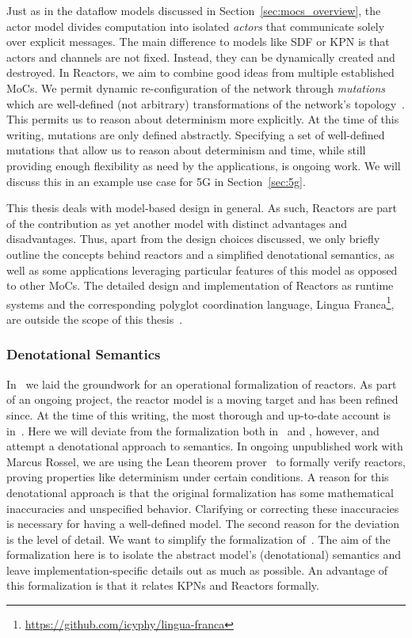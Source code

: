 Just as in the dataflow models discussed in Section~\ref{sec:mocs_overview}, the actor model divides computation into isolated \emph{actors} that communicate solely over explicit messages.
The main difference to models like \ac{SDF} or \ac{KPN} is that actors and channels are not fixed.
Instead, they can be dynamically created and destroyed.
In Reactors, we aim to combine good ideas from multiple established \acp{MoC}.
We permit dynamic re-configuration of the network through \emph{mutations} which are well-defined (not arbitrary) transformations of the network's topology~\cite{lohstroh_cyphy19}.
This permits us to reason about determinism more explicitly. 
At the time of this writing, mutations are only defined abstractly.
Specifying a set of well-defined mutations that allow us to reason about determinism and time, while still providing enough flexibility as need by the applications, is ongoing work.
We will discuss this in an example use case for 5G in Section~\ref{sec:5g}.

This thesis deals with model-based design in general.
As such, Reactors are part of the contribution as yet another model with distinct advantages and disadvantages.
Thus, apart from the design choices discussed, we only briefly outline the concepts behind reactors and a simplified denotational semantics, as well as some applications leveraging particular features of this model as opposed to other \acp{MoC}.
The detailed design and implementation of Reactors as runtime systems and the corresponding polyglot coordination language, Lingua Franca\footnote{\url{https://github.com/icyphy/lingua-franca}}, are outside the scope of this thesis~\cite{lingua_franca,lohstroh_phdthesis}.

\subsubsection{Denotational Semantics}

In~\cite{lohstroh_cyphy19} we laid the groundwork for an operational formalization of reactors.
As part of an ongoing project, the reactor model is a moving target and has been refined since.
At the time of this writing, the most thorough and up-to-date account is in~\cite{lohstroh_phdthesis}.
Here we will deviate from the formalization both in~\cite{lohstroh_cyphy19} and \cite{lohstroh_phdthesis}, however, and attempt a denotational approach to semantics.
In ongoing unpublished work with Marcus Rossel, we are using the Lean theorem prover~\cite{lean} to formally verify reactors, proving properties like determinism under certain conditions.
A reason for this denotational approach is that the original formalization has some mathematical inaccuracies and unspecified behavior.
Clarifying or correcting these inaccuracies is necessary for having a well-defined model.
The second reason for the deviation is the level of detail.
We want to simplify the formalization of~\cite{lohstroh_cyphy19,lohstroh_phdthesis}.
The aim of the formalization here is to isolate the abstract model's (denotational) semantics and leave implementation-specific details out as much as possible.
An advantage of this formalization is that it relates \acp{KPN} and Reactors formally.

